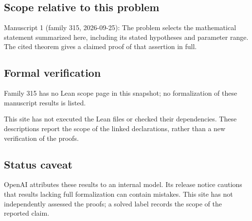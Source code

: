 \documentclass[11pt]{article}
\begin{document}
\subsection{Scope relative to this problem}
Manuscript 1 (family 315, 2026-09-25): The problem selects the mathematical statement summarized here, including its stated hypotheses and parameter range. The cited theorem gives a claimed proof of that assertion in full.

\subsection{Formal verification}
Family 315 has no Lean scope page in this snapshot; no formalization of these manuscript results is listed.

This site has not executed the Lean files or checked their dependencies. These descriptions report the scope of the linked declarations, rather than a new verification of the proofs.

\subsection{Status caveat}
OpenAI attributes these results to an internal model. Its release notice cautions that results lacking full formalization can contain mistakes. This site has not independently assessed the proofs; a solved label records the scope of the reported claim.
\end{document}
